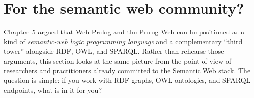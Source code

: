 %
%
%
%
%
%
%
%
%
%
%
%
%
%

\section{For the semantic web community?}\label{sec:semantic-web-community}

Chapter~5 argued that Web Prolog and the Prolog Web can be positioned as a kind of \emph{semantic-web logic programming language} and a complementary ``third tower'' alongside RDF, OWL, and SPARQL. Rather than rehearse those arguments, this section looks at the same picture from the point of view of researchers and practitioners already committed to the Semantic Web stack. The question is simple: if you work with RDF graphs, OWL ontologies, and SPARQL endpoints, what is in it for you?

